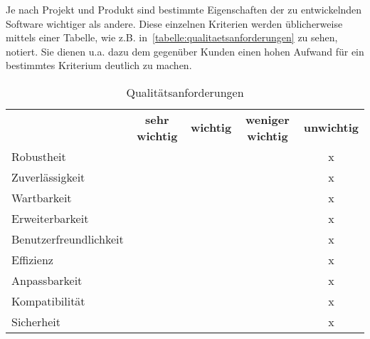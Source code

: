 \begin{tcolorbox}
Je nach Projekt und Produkt sind bestimmte Eigenschaften der zu entwickelnden Software wichtiger als andere.
Diese einzelnen Kriterien werden üblicherweise mittels einer Tabelle, wie z.B. in~\autoref{tabelle:qualitaetsanforderungen} zu sehen, notiert.
Sie dienen u.a. dazu dem gegenüber Kunden einen hohen Aufwand für ein bestimmtes Kriterium deutlich zu machen.
\end{tcolorbox}

\begin{table}[h]
	\centering
	\begin{tabularx}{\textwidth}{l c c c c}
		\rowcolor[HTML]{C0C0C0} 
		& \textbf{sehr wichtig} & \textbf{wichtig} & \textbf{weniger wichtig} & \textbf{unwichtig} \\
		Robustheit &  &  &  & x \\
		\rowcolor[HTML]{E7E7E7} 
		Zuverlässigkeit &  &  &  & x \\
		Wartbarkeit &  &  &  & x \\
		\rowcolor[HTML]{E7E7E7} 
		Erweiterbarkeit &  &  &  & x \\
		Benutzerfreundlichkeit &  &  &  & x \\
		\rowcolor[HTML]{E7E7E7} 
		Effizienz &  &  &  & x \\
		Anpassbarkeit &  &  &  & x \\
		\rowcolor[HTML]{E7E7E7} 
		Kompatibilität &  &  &  & x \\
		Sicherheit &  &  &  & x
	\end{tabularx}
	\caption{Qualitätsanforderungen}
	\label{tabelle:qualitaetsanforderungen}
\end{table}